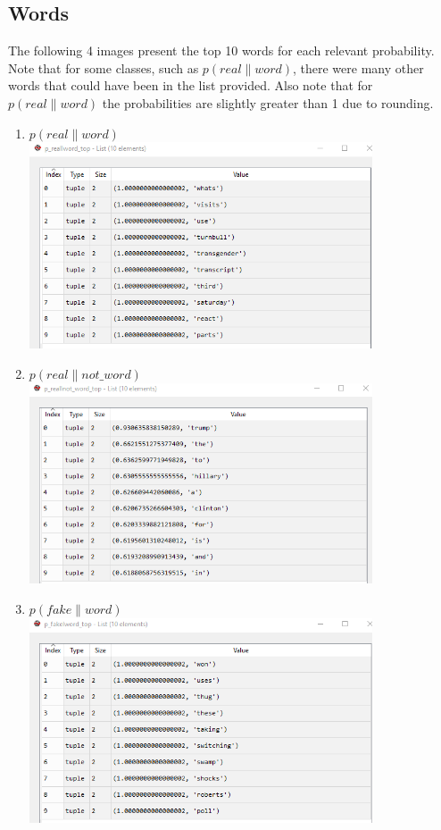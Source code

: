 \documentclass{article}
\begin{document}
 \subsection{Words}
The following 4 images present the top 10 words for each relevant probability. Note that for some classes, such as $p(real \| word)$, there were many other words that could have been in the list provided. Also note that for $ p(real \| word)$ the probabilities are
slightly greater than 1 due to rounding.
\begin{enumerate}
\item $p(real \| word)$
\\
         \includegraphics[width=4in]{resources/part3/p(realword)}

\item $p(real \| not\_word)$
\\
         \includegraphics[width=4in]{resources/part3/p(realnotword)}

\item $p(fake \| word)$
\\
         \includegraphics[width=4in]{resources/part3/p(fakeword)}


\end{enumerate}
\end{document}
